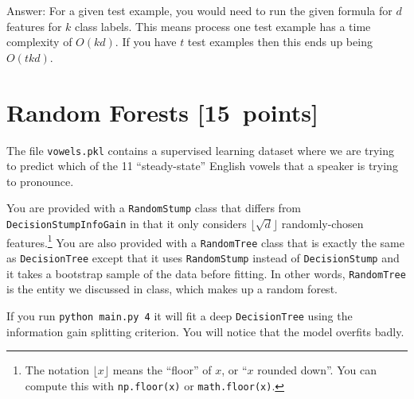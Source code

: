 \documentclass{article}
\newcommand{\gre}[1]{\textcolor{gre}{#1}}
\newcommand\ans[1]{\par\gre{Answer: #1}}
\newcommand\pts[1]{\textcolor{pointscolour}{[#1~points]}}
\begin{document}
    \ans{For a given test example, you would need to run the given formula for $d$ features for $k$ class labels. This means process one test example has a time complexity of $O(kd)$. If you have $t$ test examples then this ends up being $O(tkd)$.}


    \clearpage
    \section{Random Forests \pts{15}}

    The file \texttt{vowels.pkl} contains a supervised learning dataset where we are trying to predict which of the 11 ``steady-state'' English vowels that a speaker is trying to pronounce.

    You are provided with a \texttt{RandomStump} class that differs from
    \texttt{DecisionStumpInfoGain} in that
    it only considers $\lfloor \sqrt{d} \rfloor$ randomly-chosen features.\footnote{The notation $\lfloor x\rfloor$ means the ``floor'' of $x$, or ``$x$ rounded down''. You can compute this with \texttt{np.floor(x)} or \texttt{math.floor(x)}.}
    You are also provided with a \texttt{RandomTree} class that is exactly the same as
    \texttt{DecisionTree} except that it uses \texttt{RandomStump} instead of
    \texttt{DecisionStump} and it takes a bootstrap sample of the data before fitting.
    In other words, \texttt{RandomTree} is the entity we discussed in class, which
    makes up a random forest.

    If you run \texttt{python main.py 4} it will fit a deep \texttt{DecisionTree}
    using the information gain splitting criterion. You will notice that the model overfits badly.
\end{document}
